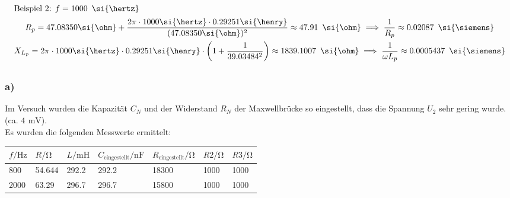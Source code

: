 \documentclass[a4paper, 12pt]{article}
\begin{document}
      \begin{gather*}
        \intertext{Beispiel 2: $f = 1000 \,\ \si{\hertz}$}
        R_p = 47.08350 \si{\ohm} + \frac{2 \pi \cdot 1000 \si{\hertz} \cdot 0.29251 \si{\henry}}{(47.08350 \si{\ohm})^2} \approx 47.91 \,\ \si{\ohm} \implies \frac{1}{R_p} \approx 0.02087 \,\ \si{\siemens}\\
        X_{L_{p}} = 2 \pi \cdot 1000 \si{\hertz} \cdot 0.29251 \si{\henry} \cdot \left( 1+\frac{1}{39.03484^2}\right) \approx 1839.1007 \,\ \si{\ohm} \implies \frac{1}{\omega L_p} \approx 0.0005437  \,\ \si{\siemens}
      \end{gather*}

  \subsection{}
    \subsubsection*{a)}
      Im Versuch wurden die Kapazität $C_N$ und der Widerstand $R_N$ der Maxwellbrücke so eingestellt, dass die Spannung $U_2$ sehr gering wurde. (ca. $4 \,\ \si{\milli\volt}$).\\
      Es wurden die folgenden Messwerte ermittelt:
      \begin{table}[H]
      \begin{center}
        \begin{tabular}{@{}lllllll@{}}
        \toprule
        $f / \si{\hertz}$    & $R /\si{\ohm}$      & $L / \si{\milli\henry}$      & $C_{\text{eingestellt}} / \si{\nano\farad}$       & $R_{\text{eingestellt}}/\si{\ohm}$  & $R2 /\si{\ohm}$   & $R3 /\si{\ohm}$   \\ \midrule
        800  & 54.644 & 292.2 & 292.2 & 18300     & 1000 & 1000 \\
        2000 & 63.29  & 296.7 & 296.7 & 15800     & 1000 & 1000 \\ \bottomrule
        \end{tabular}
      \end{center}
      \end{table}
\end{document}
